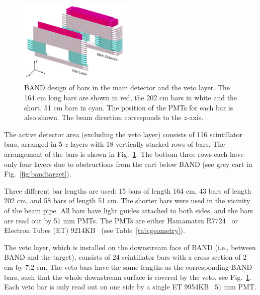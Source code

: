 \documentclass[3p,twocolumn]{elsarticle}
\begin{document}
\begin{figure}[tb]
	\centering
			\includegraphics[width=0.48\textwidth]{band-schematic.jpg}
            \caption{BAND design of bars in the main
                   detector and the veto layer. The 164 \si{\centi\meter} long bars are shown in
                          red, the 202 \si{\centi\meter} bars in white
                          and the short, 51 \si{\centi\meter} bars in cyan. The position of
                          the PMTs for each bar is also shown. The beam direction corresponds to the $z$-axis.   }
		\label{fig:design}
\end{figure}

The active detector area (excluding the veto layer) consists of 116 scintillator bars, arranged
in 5 $z$-layers with 18 vertically stacked rows of bars. The arrangement of the
bars is shown in Fig.~\ref{fig:design}. The bottom three rows each have only
four layers due to obstructions from the cart below BAND (see grey cart in Fig.~\ref{fig:bandtarget}).

Three different bar lengths are used: 15 bars of length 164 \si{\centi\meter}, 43 bars of length 202 \si{\centi\meter}, and 58 bars of length 
51 \si{\centi\meter}. The shorter bars were used in the vicinity of
the beam pipe. All bars have light guides attached to both sides, and the bars
are read out by 51 \si{\milli\meter} PMTs. The PMTs are either Hamamatsu R7724~\cite{pmtR7724} or Electron Tubes (ET) 9214KB~\cite{pmt9214} (see Table~\ref{tab:geometry}).

The veto layer, which is installed on the downstream face of BAND
(i.e., between BAND and the target),
consists of 24 scintillator bars with a cross section of $2$
\si{\centi\meter} by $7.2$ \si{\centi\meter}. The veto bars have the
same lengths as the corresponding BAND bars, such that the whole
downstream surface is covered by the veto, see
Fig.~\ref{fig:design}. Each veto bar is only read out on one side by a
single ET 9954KB~\cite{pmt9954} 51 \si{\milli\meter} PMT.
\end{document}
